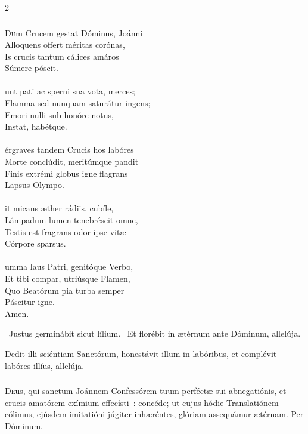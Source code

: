 \documentclass[9pt,twoside]{extarticle}
\begin{document}
\begin{multicols}{2}
{{\subsubsection*{\center {}}
\lettrine{D}um Crucem gestat Dóminus, Joánni\\
Alloquens offert méritas corónas,\\
Is crucis tantum cálices amáros\\
Súmere póscit.\\
\\
unt pati ac sperni sua vota, merces;\\
Flamma sed nunquam saturátur ingens;\\
Emori nulli sub honóre notus,\\
Instat, habétque.\\
\\
érgraves tandem Crucis hos labóres\\
Morte conclúdit, meritúmque pandit\\
Finis extrémi globus igne flagrans\\
Lapsus Olympo.\\
\\
it micans æther rádiis, cubíle,\\
Lámpadum lumen tenebréscit omne,\\
Testis est fragrans odor ipse vitæ\\
Córpore sparsus.\\
\\
umma laus Patri, genitóque Verbo,\\
Et tibi compar, utriúsque Flamen,\\
Quo Beatórum pia turba semper\\
Páscitur igne.\\
Amen.

\begin{tightlist}{}
\item {}~Justus germinábit sicut lílium. ~Et florébit in ætérnum ante Dóminum, allelúja.
\item {} Dedit illi sciéntiam Sanctórum, honestávit illum in labóribus, et complévit labóres illíus, allelúja.
\end{tightlist}

\subsubsection*{\center {}}
\lettrine{D}eus, qui sanctum Joánnem Confessórem tuum perféctæ sui abnegatiónis, et crucis amatórem exímium effecísti~: concéde; ut cujus hódie Translatiónem cólimus, ejúsdem imitatióni júgiter inhæréntes, glóriam assequámur ætérnam. Per Dóminum.

}}
\end{multicols}
\end{document}
